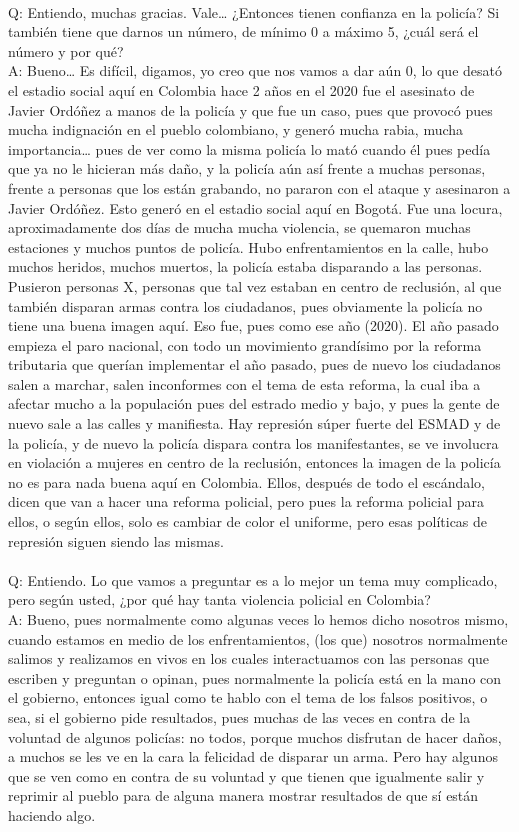 \documentclass{phyasgn}\usepackage{nag}
\begin{document}
\\
Q: Entiendo, muchas gracias. Vale… ¿Entonces tienen confianza en la policía? Si también tiene que darnos un número, de mínimo 0 a máximo 5, ¿cuál será el número y por qué?\\
A: Bueno… Es difícil, digamos, yo creo que nos vamos a dar aún 0, lo que desató el estadio social aquí en Colombia hace 2 años en el 2020 fue el asesinato de Javier Ordóñez a manos de la policía y que fue un caso, pues que provocó pues mucha indignación en el pueblo colombiano, y generó mucha rabia, mucha importancia… pues de ver como la misma policía lo mató cuando él pues pedía que ya no le hicieran más daño, y la policía aún así frente a muchas personas, frente a personas que los están grabando, no pararon con el ataque y asesinaron a Javier Ordóñez. Esto generó en el estadio social aquí en Bogotá. Fue una locura, aproximadamente dos días de mucha mucha violencia, se quemaron muchas estaciones y muchos puntos de policía. Hubo enfrentamientos en la calle, hubo muchos heridos, muchos muertos, la policía estaba disparando a las personas. Pusieron personas X, personas que tal vez estaban en centro de reclusión, al que también disparan armas contra los ciudadanos, pues obviamente la policía no tiene una buena imagen aquí. Eso fue, pues como ese año (2020). El año pasado empieza el paro nacional, con todo un movimiento grandísimo por la reforma tributaria que querían implementar el año pasado, pues de nuevo los ciudadanos salen a marchar, salen inconformes con el tema de esta reforma, la cual iba a afectar mucho a la populación pues del estrado medio y bajo, y pues la gente de nuevo sale a las calles y manifiesta. Hay represión súper fuerte del ESMAD y de la policía, y de nuevo la policía dispara contra los manifestantes, se ve involucra en violación a mujeres en centro de la reclusión, entonces la imagen de la policía no es para nada buena aquí en Colombia. Ellos, después de todo el escándalo, dicen que van a hacer una reforma policial, pero pues la reforma policial para ellos, o según ellos, solo es cambiar de color el uniforme, pero esas políticas de represión siguen siendo las mismas. \\
\\
Q: Entiendo. Lo que vamos a preguntar es a lo mejor un tema muy complicado, pero según usted, ¿por qué hay tanta violencia policial en Colombia?\\
A: Bueno, pues normalmente como algunas veces lo hemos dicho nosotros mismo, cuando estamos en medio de los enfrentamientos, (los que) nosotros normalmente salimos y realizamos en vivos en los cuales interactuamos con las personas que escriben y preguntan o opinan, pues normalmente la policía está en la mano con el gobierno, entonces igual como te hablo con el tema de los falsos positivos, o sea, si el gobierno pide resultados, pues muchas de las veces en contra de la voluntad de algunos policías: no todos, porque muchos disfrutan de hacer daños, a muchos se les ve en la cara la felicidad de disparar un arma. Pero hay algunos que se ven como en contra de su voluntad y que tienen que igualmente salir y reprimir al pueblo para de alguna manera mostrar resultados de que sí están haciendo algo. \\
\end{document}
